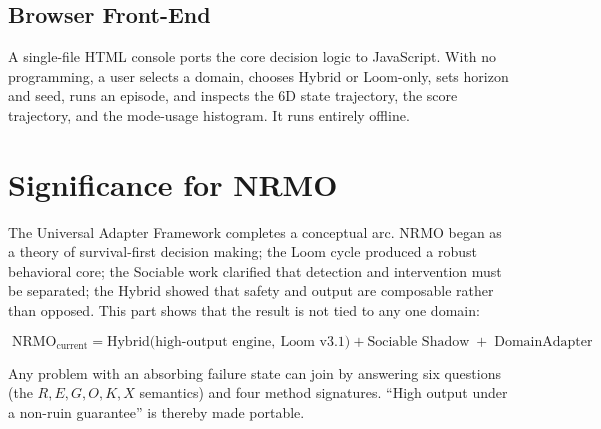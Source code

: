 \section{Browser Front-End}
A single-file HTML console ports the core decision logic to JavaScript.
With no programming, a user selects a domain, chooses Hybrid or
Loom-only, sets horizon and seed, runs an episode, and inspects the
6D state trajectory, the score trajectory, and the mode-usage
histogram. It runs entirely offline.

\chapter{Significance for NRMO}
\label{ch:adapter_significance}

The Universal Adapter Framework completes a conceptual arc. NRMO began
as a theory of survival-first decision making; the Loom cycle produced
a robust behavioral core; the Sociable work clarified that detection
and intervention must be separated; the Hybrid showed that safety and
output are composable rather than opposed. This part shows that the
result is not tied to any one domain:

\begin{equation*}
\boxed{\;
\text{NRMO}_{\text{current}}
= \text{Hybrid}\big(\text{high-output engine},\ \text{Loom v3.1}\big)
+ \text{Sociable Shadow}
\;+\;\text{DomainAdapter}
\;}
\end{equation*}

Any problem with an absorbing failure state can join by answering six
questions (the $R,E,G,O,K,X$ semantics) and four method signatures.
``High output under a non-ruin guarantee'' is thereby made portable.
